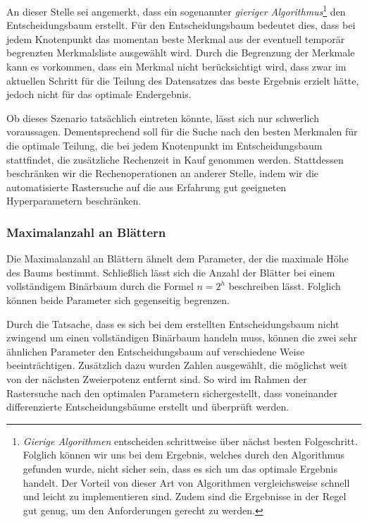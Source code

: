 \documentclass[12pt, a4paper]{article}
\begin{document}
An dieser Stelle sei angemerkt, dass ein sogenannter \textit{gieriger Algorithmus}\footnote{\textit{Gierige Algorithmen} entscheiden schrittweise über nächst besten Folgeschritt. Folglich können wir uns bei dem Ergebnis, welches durch den Algorithmus gefunden wurde, nicht sicher sein, dass es sich um das optimale Ergebnis handelt. Der Vorteil von dieser Art von Algorithmen vergleichsweise schnell und leicht zu implementieren sind. Zudem sind die Ergebnisse in der Regel gut genug, um den Anforderungen gerecht zu werden.} den Entscheidungsbaum erstellt. Für den Entscheidungsbaum bedeutet dies, dass bei jedem Knotenpunkt das momentan beste Merkmal aus der eventuell temporär begrenzten Merkmalsliste ausgewählt wird. Durch die Begrenzung der Merkmale kann es vorkommen, dass ein Merkmal nicht berücksichtigt wird, dass zwar im aktuellen Schritt für die Teilung des Datensatzes das beste Ergebnis erzielt hätte, jedoch nicht für das optimale Endergebnis.

Ob dieses Szenario tatsächlich eintreten könnte, lässt sich nur schwerlich voraussagen. Dementsprechend soll für die Suche nach den besten Merkmalen für die optimale Teilung, die bei jedem Knotenpunkt im Entscheidungsbaum stattfindet, die zusätzliche Rechenzeit in Kauf genommen werden. Stattdessen beschränken wir die Rechenoperationen an anderer Stelle, indem wir die automatisierte Rastersuche auf die aus Erfahrung gut geeigneten Hyperparametern beschränken.

\subsubsection{Maximalanzahl an Blättern}

Die Maximalanzahl an Blättern ähnelt dem Parameter, der die maximale Höhe des Baums bestimmt. Schließlich lässt sich die Anzahl der Blätter bei einem vollständigem Binärbaum durch die Formel $n=2^h$ beschreiben lässt. Folglich können beide Parameter sich gegenseitig begrenzen.

Durch die Tatsache, dass es sich bei dem erstellten Entscheidungsbaum nicht zwingend um einen vollständigen Binärbaum handeln muss, können die zwei sehr ähnlichen Parameter den Entscheidungsbaum auf verschiedene Weise beeinträchtigen.
Zusätzlich dazu wurden Zahlen ausgewählt, die möglichst weit von der nächsten Zweierpotenz entfernt sind. So wird im Rahmen der Rastersuche nach den optimalen Parametern sichergestellt, dass voneinander differenzierte Entscheidungsbäume erstellt und überprüft werden.
\end{document}
